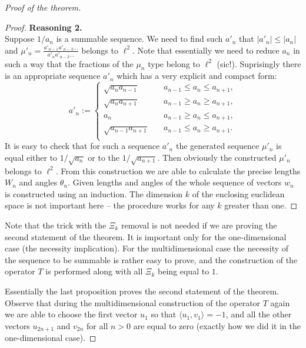 \begin{proof}[Proof of the theorem]
\begin{proof}
      \textbf{Reasoning 2.}\\
      Suppose $1/a_n$ is a summable sequence.
      We need to find such $a'_n$ that $|a'_n| \leq |a_n|$ and $\mu'_n = \frac{a'_{n-1} a'_{n-3} \dots}{a'_{n} a'_{n-2} \dots }$ belongs to $\ell^2$.
      Note that essentially we need to reduce $a_n$ in such a way that the fractions of the $\mu_n$ type belong to $\ell^2$ (sic!).
      Suprisingly there is an appropriate sequence $a'_n$ which has a very explicit and compact form:
      \begin{equation*}
        a'_n := \begin{cases}
          \sqrt{a_n a_{n-1}} & \quad a_{n-1} \leq a_n \leq a_{n+1},\\
          \sqrt{a_n a_{n+1}} & \quad a_{n-1} \geq a_n \geq a_{n+1},\\
          a_n & \quad a_{n-1} \geq a_n \leq a_{n+1},\\
          \sqrt{a_{n-1} a_{n+1}} &\quad a_{n-1} \leq a_n \geq a_{n+1}.\\
        \end{cases}
      \end{equation*}
      It is easy to check that for such a sequence $a'_n$ the generated sequence $\mu'_n$ is equal either to $1/\sqrt{a_n}$ or to the $1/\sqrt{a_{n+1}}$.
      Then obviously the constructed $\mu'_n$ belongs to $\ell^2$.
      From this construction we are able to calculate the precise lengths $W_n$ and angles $\theta_n$.
      Given lengths and angles of the whole sequence of vectors $w_n$ is constructed using an induction.
      The dimension $k$ of the enclosing euclidean space is not important here -- the procedure works for any $k$ greater than one.
    \end{proof}
    \begin{remark}
      Note that the trick with the $\Xi_k$ removal is not needed if we are proving the second statement of the theorem.
      It is important only for the one-dimensional case (the necessity implication).
      For the multidimensional case the necessity of
      the sequence to be summable is rather easy to prove, and the construction of the operator $T$ is
      performed along with all $\Xi_k$ being equal to $1$.
    \end{remark}
    Essentially the last proposition proves the second statement of the theorem.
    Observe that during the multidimensional construction of the operator $T$ again
      we are able to choose the first vector $u_1$ so that $\langle u_1,v_1 \rangle = -1$,
      and all the other vectors $u_{2n+1}$ and $v_{2n}$ for all $n>0$ are equal to zero (exactly how we did it in the one-dimensional case).
  \end{proof}
